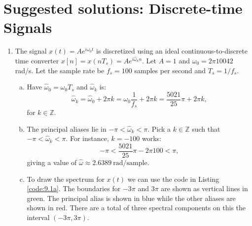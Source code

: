 
\newpage
\section{Suggested solutions: Discrete-time Signals}
\begin{enumerate}
  \item The signal $x(t)=Ae^{i\omega_{0}t}$ is discretized using an ideal continuous-to-discrete time 
        converter $x[n]=x(nT_{s})=Ae^{i\hat{\omega}_{k}n}$. Let $A=1$ and $\omega_{0}=2\pi 10042$ rad/s. 
        Let the sample rate be $f_{s}=100$ samples per second and $T_{s}=1/f_{s}$.

        \begin{enumerate}[a)]
          \item Have $\hat{\omega}_{0}=\omega_{0}T_{s}$ and $\hat{\omega}_{k}$ is:
                \[ \hat{\omega}_{k}=\hat{\omega}_{0}+2\pi k=\omega_{0}\frac{1}{f_{s}}+2\pi k=\frac{5021}{25}\pi+2\pi k, \]
                for $k\in\mathbb{Z}$.

          \item The principal aliases lie in $-\pi<\hat{\omega}_{k}<\pi$. Pick a $k\in\mathbb{Z}$ such that 
                $-\pi<\hat{\omega}_{k}<\pi$. For instance, $k=-100$ works:
                \[ -\pi < \frac{5021}{25}\pi-2\pi 100 < \pi, \]
                giving a value of $\hat{\omega}\approx2.6389\ \text{rad/sample}$.

          \item To draw the spectrum for $x(t)$ we can use the code in Listing \ref{code:9.1a}. 
                The boundaries for $-3\pi$ and $3\pi$ are shown as vertical lines in green. 
                The principal alias is shown in blue while the other aliases are shown in red. 
                There are a total of three spectral components on this the interval $(-3\pi, 3\pi)$.

                


\end{enumerate}
\end{enumerate}
